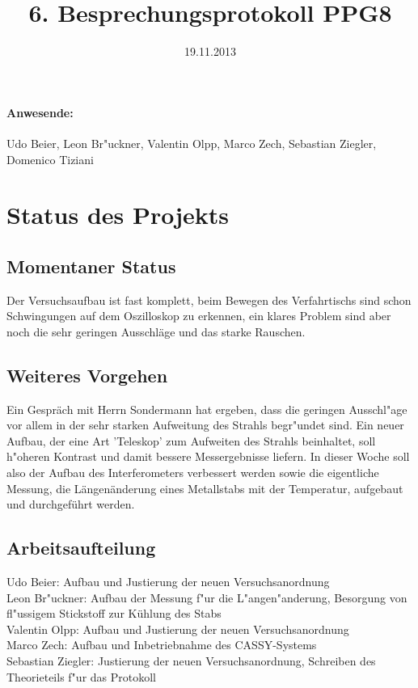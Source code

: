 \documentclass[
]{scrartcl}
\begin{document}
\title{6. Besprechungsprotokoll PPG8}
\date{19.11.2013}
\maketitle

\paragraph{Anwesende:}
Udo Beier, Leon Br"uckner, Valentin Olpp, Marco Zech, Sebastian Ziegler, Domenico Tiziani


\section{Status des Projekts}

\subsection{Momentaner Status}
Der Versuchsaufbau ist fast komplett, beim Bewegen des Verfahrtischs sind schon Schwingungen auf dem Oszilloskop zu erkennen, ein klares Problem sind aber noch die sehr geringen Ausschläge und das starke Rauschen.

\subsection{Weiteres Vorgehen}
Ein Gespräch mit Herrn Sondermann hat ergeben, dass die geringen Ausschl"age vor allem in der sehr starken Aufweitung des Strahls begr"undet sind. Ein neuer Aufbau, der eine Art 'Teleskop' zum Aufweiten des Strahls beinhaltet, soll h"oheren Kontrast und damit bessere Messergebnisse liefern.
In dieser Woche soll also der Aufbau des Interferometers verbessert werden sowie die eigentliche Messung, die Längenänderung eines Metallstabs mit der Temperatur, aufgebaut und durchgeführt werden.

\subsection{Arbeitsaufteilung}
Udo Beier: Aufbau und Justierung der neuen Versuchsanordnung
\\
Leon Br"uckner: Aufbau der Messung f"ur die L"angen"anderung, Besorgung von fl"ussigem Stickstoff zur Kühlung des Stabs
\\
Valentin Olpp: Aufbau und Justierung der neuen Versuchsanordnung
\\
Marco Zech: Aufbau und Inbetriebnahme des CASSY-Systems
\\
Sebastian Ziegler: Justierung der neuen Versuchsanordnung, Schreiben des Theorieteils f"ur das Protokoll
\end{document}
